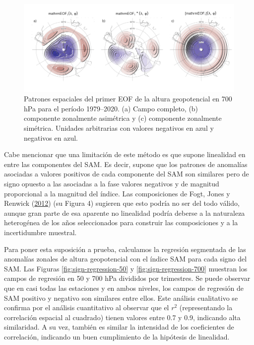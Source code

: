 \documentclass[12pt,oneside,a4paper]{reedthesis}
\begin{document}
\begin{figure}

{\centering \includegraphics{figures/30-sam/method-1} 

}

\caption{Patrones espaciales del primer EOF de la altura geopotencial en 700 hPa para el período 1979--2020. (a) Campo completo, (b) componente zonalmente asimétrica y (c) componente zonalmente simétrica. Unidades arbitrarias con valores negativos en azul y negativos en azul.}\label{fig:method}
\end{figure}

Cabe mencionar que una limitación de este método es que supone linealidad en entre las componentes del SAM.
Es decir, supone que los patrones de anomalías asociadas a valores positivos de cada componente del SAM son similares pero de signo opuesto a las asociadas a la fase valores negativos y de magnitud proporcional a la magnitud del índice.
Las composiciones de Fogt, Jones y Renwick (\protect\hyperlink{ref-fogt2012}{2012}) (su Figura 4) sugieren que esto podría no ser del todo válido, aunque gran parte de esa aparente no linealidad podría deberse a la naturaleza heterogénea de los años seleccionados para construir las composiciones y a la incertidumbre muestral.

Para poner esta suposición a prueba, calculamos la regresión segmentada de las anomalías zonales de altura geopotencial con el índice SAM para cada signo del SAM.
Las Figuras \ref{fig:sign-regression-50} y \ref{fig:sign-regression-700} muestran los campos de regresión en 50 y 700 hPa divididos por trimestres.
Se puede observar que en casi todas las estaciones y en ambos niveles, los campos de regresión de SAM positivo y negativo son similares entre ellos.
Este análisis cualitativo se confirma por el análisis cuantitativo al observar que el \(r^2\) (representando la correlación espacial al cuadrado) tienen valores entre 0.7 y 0.9, indicando alta similaridad.
A su vez, también es similar la intensidad de los coeficientes de correlación, indicando un buen cumplimiento de la hipótesis de linealidad.
\end{document}
